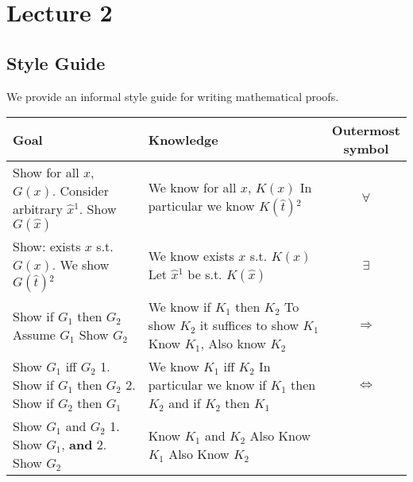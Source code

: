 \section{Lecture 2}

\subsection{Style Guide}
We provide an informal style guide for writing mathematical proofs. 

\begin{center}
    \begin{tabular}{l|l|c}
     Goal & Knowledge & \shortstack[c]{Outermost\\symbol} \\
    \hline 
        \pbox{20cm}{Show for all $x$, $G(x)$. \\ Consider arbitrary $\hat{x}{}^1$.\\ Show $G(\hat{x})$}
      & \pbox{20cm}{We know for all $x$, $K(x)$ \\ In particular we know $K(\hat{t}){}^2$}
      & $\forall$ \\
    \hline 
        \pbox{20cm}{Show: exists $x$ s.t. $G(x)$. \\ We show $G(\hat{t}){}^2$}
      & \pbox{20cm}{We know exists $x$ s.t. $K(x)$ \\ Let $\hat{x}{}^1$ be s.t. $K(\hat{x})$}
      & $\exists$ \\
    \hline
        \pbox{20cm}{Show if $G_1$ then $G_2$ \\ Assume $G_1$\\ Show $G_2$}
      & \pbox{20cm}{We know if $K_1$ then $K_2$\\ To show $K_2$ it suffices to show $K_1$\\ Know $K_1$, Also know $K_2$}
      & $\Rightarrow$ \\
    \hline
        \pbox{20cm}{Show $G_1$ iff $G_2$ \\ 1. Show if $G_1$ then $G_2$\\ 2. Show if $G_2$ then $G_1$}
      & \pbox{20cm}{We know $K_1$ iff $K_2$\\ In particular we know if $K_1$ then $K_2$\\ and if $K_2$ then $K_1$}
      & $\iff$ \\
    \hline
        \pbox{20cm}{Show $G_1$ and $G_2$\\ 1. Show $G_1$, \textbf{and}\\ 2. Show $G_2$}
      & \pbox{20cm}{Know $K_1$ and $K_2$\\ Also Know $K_1$ \\ Also Know $K_2$}

\end{tabular}
\end{center}
